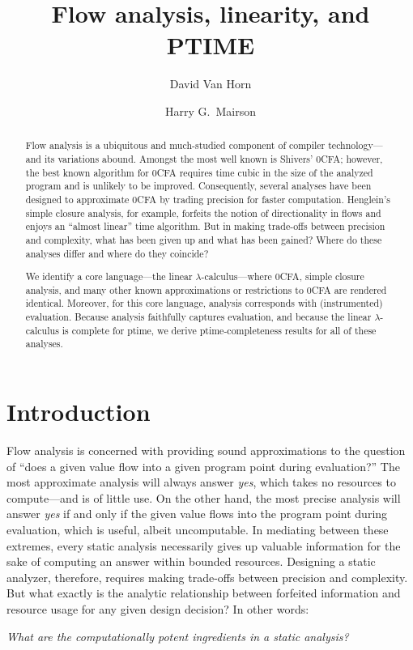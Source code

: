 \documentclass{llncs}
\title{Flow analysis, linearity, and PTIME}
\author{David {Van Horn} \and Harry G.~Mairson}
\institute{
Department of Computer Science\\
Brandeis University\\
Waltham, Massachusetts 02454\\
\email{\{dvanhorn,mairson\}@cs.brandeis.edu}
}
\newcommand\ptime{{\sc ptime}}
\begin{document}
\mainmatter
\maketitle

\begin{abstract}

Flow analysis is a ubiquitous and much-studied component of compiler
technology---and its variations abound.  Amongst the most well known is
Shivers' 0CFA; however, the best known algorithm for 0CFA requires
time cubic in the size of the analyzed program and is unlikely to be
improved.  Consequently, several analyses have been designed to
approximate 0CFA by trading precision for faster computation.
Henglein's simple closure analysis, for example, forfeits the notion
of directionality in flows and enjoys an ``almost linear'' time
algorithm.  But in making trade-offs between precision and complexity,
what has been given up and what has been gained?  Where do these
analyses differ and where do they coincide?

We identify a core language---the linear $\lambda$-calculus---where
0CFA, simple closure analysis, and many other known approximations or
restrictions to 0CFA are rendered identical.  Moreover, for this core
language, analysis corresponds with (instrumented) evaluation.
Because analysis faithfully captures evaluation, and because the
linear $\lambda$-calculus is complete for \ptime, we derive
\ptime-completeness results for all of these analyses.
\end{abstract}






\section{Introduction}
\label{sec:intro}


Flow analysis \cite{jones-81,sestoft-88,shivers-phd,midtgaard-07} is
concerned with providing sound approximations to the question of
``does a given value flow into a given program point during
evaluation?''  The most approximate analysis will always answer {\em
yes}, which takes no resources to compute---and is of little use.  On
the other hand, the most precise analysis will answer {\em yes} if and
only if the given value flows into the program point during
evaluation, which is useful, albeit uncomputable.  In mediating
between these extremes, every static analysis necessarily gives up
valuable information for the sake of computing an answer within
bounded resources.  Designing a static analyzer, therefore, requires
making trade-offs between precision and complexity. But what exactly
is the analytic relationship between forfeited information and
resource usage for any given design decision?  In other words:
\begin{center}
{\em What are the computationally potent ingredients in a
static analysis?}
\end{center}
\end{document}
